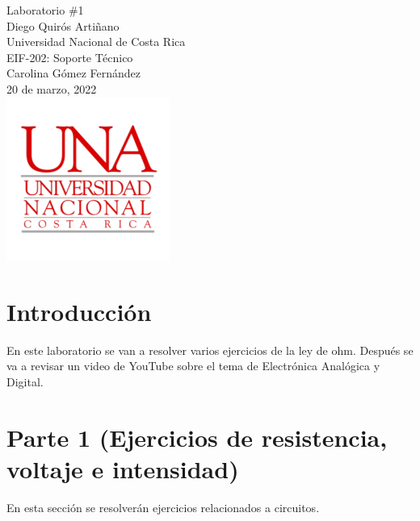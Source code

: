 \documentclass[stu, 12pt, letterpaper, donotrepeattitle, floatsintext, natbib, helv]{apa7}
\begin{document}
\begin{titlepage}
    \centering
    \vfill
    \LARGE Laboratorio \#1\\
    \vskip2cm
    \large Diego Quirós Artiñano \\
    Universidad Nacional de Costa Rica \\
    EIF-202: Soporte Técnico \\ 
    Carolina Gómez Fernández \\
    20 de marzo, 2022 \\
    \vfill
    \includegraphics[width = 0.4\textwidth]{UNA.png} \\
    \vfill
    \vfill
\end{titlepage}

\renewcommand\contentsname{\largeÍndice}
\tableofcontents
\setcounter{tocdepth}{2}
\newpage


\section{Introducción}

En este laboratorio se van a resolver varios ejercicios de la ley de ohm. Después se va a revisar un video de YouTube sobre el tema de Electrónica Analógica y Digital.

\section{Parte 1 (Ejercicios de resistencia, voltaje e intensidad)}
En esta sección se resolverán ejercicios relacionados a circuitos. \\
\end{document}
